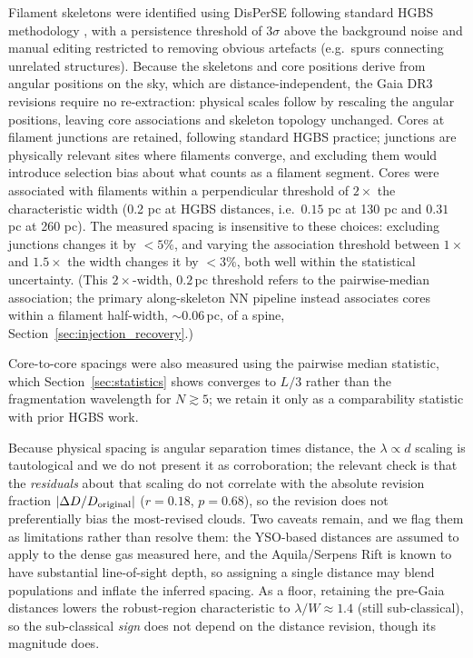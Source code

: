 \documentclass[usenatbib,twoside,twocolumn]{mnras}
\begin{document}
Filament skeletons were identified using DisPerSE \citep{Sousbie2011} following standard HGBS methodology \citep{Arzoumanian2011}, with a persistence threshold of $3\sigma$ above the background noise and manual editing restricted to removing obvious artefacts (e.g.\ spurs connecting unrelated structures). Because the skeletons and core positions derive from angular positions on the sky, which are distance-independent, the Gaia DR3 revisions require no re-extraction: physical scales follow by rescaling the angular positions, leaving core associations and skeleton topology unchanged. Cores at filament junctions are retained, following standard HGBS practice; junctions are physically relevant sites where filaments converge, and excluding them would introduce selection bias about what counts as a filament segment. Cores were associated with filaments within a perpendicular threshold of $2\times$ the characteristic width (0.2 pc at HGBS distances, i.e.\ $0.15$ pc at 130 pc and $0.31$ pc at 260 pc). The measured spacing is insensitive to these choices: excluding junctions changes it by $<5\%$, and varying the association threshold between $1\times$ and $1.5\times$ the width changes it by $<3\%$, both well within the statistical uncertainty. (This $2\times$-width, $0.2$\,pc threshold refers to the pairwise-median association; the primary along-skeleton NN pipeline instead associates cores within a filament half-width, $\sim0.06$\,pc, of a spine, Section~\ref{sec:injection_recovery}.)

Core-to-core spacings were also measured using the pairwise median statistic, which Section~\ref{sec:statistics} shows converges to $L/3$ rather than the fragmentation wavelength for $N\gtrsim5$; we retain it only as a comparability statistic with prior HGBS work.

Because physical spacing is angular separation times distance, the $\lambda\propto d$ scaling is tautological and we do not present it as corroboration; the relevant check is that the \emph{residuals} about that scaling do not correlate with the absolute revision fraction $|\Delta D/D_{\rm original}|$ ($r=0.18$, $p=0.68$), so the revision does not preferentially bias the most-revised clouds. Two caveats remain, and we flag them as limitations rather than resolve them: the YSO-based distances \citep{Zhang2023} are assumed to apply to the dense gas measured here, and the Aquila/Serpens Rift is known to have substantial line-of-sight depth, so assigning a single distance may blend populations and inflate the inferred spacing. As a floor, retaining the pre-Gaia distances lowers the robust-region characteristic to $\lambda/W\approx1.4$ (still sub-classical), so the sub-classical \emph{sign} does not depend on the distance revision, though its magnitude does.
\end{document}
